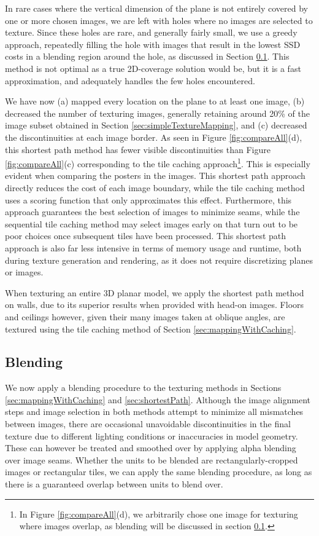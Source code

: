 \documentclass[]{spie}  %
\begin{document}
In rare cases where the vertical dimension of the plane is not
entirely covered by one or more chosen images, we are left with holes
where no images are selected to texture. Since these holes are rare,
and generally fairly small, we use a greedy approach, repeatedly
filling the hole with images that result in the lowest SSD costs in a
blending region around the hole, as discussed in Section
\ref{sec:blending}. This method is not optimal as a true 2D-coverage
solution would be, but it is a fast approximation, and adequately
handles the few holes encountered.

We have now (a) mapped every location on the plane to at least one
image, (b) decreased the number of texturing images, generally
retaining around 20\% of the image subset obtained in Section
\ref{sec:simpleTextureMapping}, and (c) decreased the discontinuities
at each image border. As seen in Figure \ref{fig:compareAll}(d), this
shortest path method has fewer visible discontinuities than Figure
\ref{fig:compareAll}(c) corresponding to the tile caching
approach\footnote{In Figure \ref{fig:compareAll}(d), we arbitrarily
  chose one image for texturing where images overlap, as blending will
  be discussed in section \ref{sec:blending}.}. This is especially
evident when comparing the posters in the images. This shortest path
approach directly reduces the cost of each image boundary,
while the tile caching method uses a scoring function that only
approximates this effect. Furthermore, this approach guarantees the
best selection of images to minimize seams, while the sequential tile
caching method may select images early on that turn out to be poor
choices once subsequent tiles have been processed. This shortest path
approach is also far less intensive in terms of memory usage and
runtime, both during texture generation and rendering, as it does not
require discretizing planes or images.

When texturing an entire 3D planar model, we apply the shortest path
method on walls, due to its superior results when provided with
head-on images. Floors and ceilings however, given their many images
taken at oblique angles, are textured using the tile caching method of
Section \ref{sec:mappingWithCaching}.


\subsection{Blending}
\label{sec:blending}
We now apply a blending procedure to the texturing methods in Sections
\ref{sec:mappingWithCaching} and \ref{sec:shortestPath}. Although the
image alignment steps and image selection in both methods attempt to
minimize all mismatches between images, there are occasional
unavoidable discontinuities in the final texture due to different
lighting conditions or inaccuracies in model geometry. These can
however be treated and smoothed over by applying alpha blending over
image seams.  Whether the units to be blended are
rectangularly-cropped images or rectangular tiles, we can apply the
same blending procedure, as long as there is a guaranteed overlap
between units to blend over.
\end{document}
